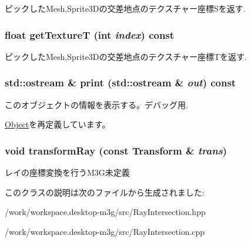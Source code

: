 ピックしたMesh,Sprite3Dの交差地点のテクスチャー座標Sを返す. \hypertarget{classm3g_1_1RayIntersection_843d5b907bb54a6f28571f0a0f14c932}{
\subsubsection[{getTextureT}]{\setlength{\rightskip}{0pt plus 5cm}float getTextureT (int {\em index}) const}}
\label{classm3g_1_1RayIntersection_843d5b907bb54a6f28571f0a0f14c932}


ピックしたMesh,Sprite3Dの交差地点のテクスチャー座標Tを返す. \hypertarget{classm3g_1_1RayIntersection_6fea17fa1532df3794f8cb39cb4f911f}{
\subsubsection[{print}]{\setlength{\rightskip}{0pt plus 5cm}std::ostream \& print (std::ostream \& {\em out}) const}}
\label{classm3g_1_1RayIntersection_6fea17fa1532df3794f8cb39cb4f911f}


このオブジェクトの情報を表示する。デバッグ用. 

\hyperlink{classm3g_1_1Object_6fea17fa1532df3794f8cb39cb4f911f}{Object}を再定義しています。\hypertarget{classm3g_1_1RayIntersection_ee558b3e4c2a54d66f2bb47e3dea6188}{
\subsubsection[{transformRay}]{\setlength{\rightskip}{0pt plus 5cm}void transformRay (const {\bf Transform} \& {\em trans})}}
\label{classm3g_1_1RayIntersection_ee558b3e4c2a54d66f2bb47e3dea6188}


レイの座標変換を行うM3G未定義 

このクラスの説明は次のファイルから生成されました:\begin{CompactItemize}
\item 
/work/workspace.desktop-m3g/src/RayIntersection.hpp\item 
/work/workspace.desktop-m3g/src/RayIntersection.cpp\end{CompactItemize}
